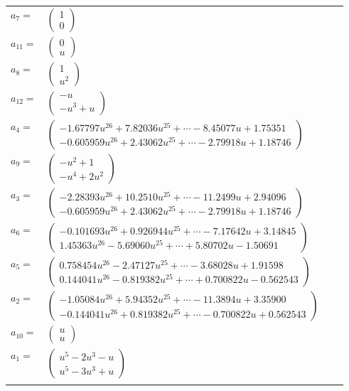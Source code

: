 \documentclass[1p]{elsarticle_modified}
\theoremstyle{definition}
\begin{document}
\begin{tabular}{m{7pt} m{180pt} m{7pt} m{180pt} }
\flushright $a_{7}=$&$\begin{pmatrix}1\\0\end{pmatrix}$ \\
\flushright $a_{11}=$&$\begin{pmatrix}0\\u\end{pmatrix}$ \\
\flushright $a_{8}=$&$\begin{pmatrix}1\\u^2\end{pmatrix}$ \\
\flushright $a_{12}=$&$\begin{pmatrix}- u\\- u^3+u\end{pmatrix}$ \\
\flushright $a_{4}=$&$\begin{pmatrix}-1.67797 u^{26}+7.82036 u^{25}+\cdots-8.45077 u+1.75351\\-0.605959 u^{26}+2.43062 u^{25}+\cdots-2.79918 u+1.18746\end{pmatrix}$ \\
\flushright $a_{9}=$&$\begin{pmatrix}- u^2+1\\- u^4+2 u^2\end{pmatrix}$ \\
\flushright $a_{3}=$&$\begin{pmatrix}-2.28393 u^{26}+10.2510 u^{25}+\cdots-11.2499 u+2.94096\\-0.605959 u^{26}+2.43062 u^{25}+\cdots-2.79918 u+1.18746\end{pmatrix}$ \\
\flushright $a_{6}=$&$\begin{pmatrix}-0.101693 u^{26}+0.926944 u^{25}+\cdots-7.17642 u+3.14845\\1.45363 u^{26}-5.69060 u^{25}+\cdots+5.80702 u-1.50691\end{pmatrix}$ \\
\flushright $a_{5}=$&$\begin{pmatrix}0.758454 u^{26}-2.47127 u^{25}+\cdots-3.68028 u+1.91598\\0.144041 u^{26}-0.819382 u^{25}+\cdots+0.700822 u-0.562543\end{pmatrix}$ \\
\flushright $a_{2}=$&$\begin{pmatrix}-1.05084 u^{26}+5.94352 u^{25}+\cdots-11.3894 u+3.35900\\-0.144041 u^{26}+0.819382 u^{25}+\cdots-0.700822 u+0.562543\end{pmatrix}$ \\
\flushright $a_{10}=$&$\begin{pmatrix}u\\u\end{pmatrix}$ \\
\flushright $a_{1}=$&$\begin{pmatrix}u^5-2 u^3- u\\u^5-3 u^3+u\end{pmatrix}$\\&\end{tabular}
\end{document}
